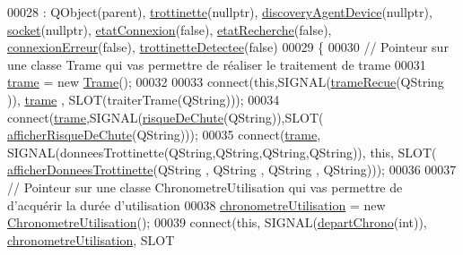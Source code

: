 \begin{DoxyCode}
00028                                                     : QObject(parent), 
      \hyperlink{class_peripherique_local_aa110b2c3292270553f592362e45f710b}{trottinette}(\textcolor{keyword}{nullptr}), \hyperlink{class_peripherique_local_a9e398b7dd89a20b1bee67b8c3467da69}{discoveryAgentDevice}(\textcolor{keyword}{nullptr}), 
      \hyperlink{class_peripherique_local_a0058bf8367b4b8f907838b83a9150c07}{socket}(\textcolor{keyword}{nullptr}), \hyperlink{class_peripherique_local_a5359e5a94b32b8a90c06ec999de13d2c}{etatConnexion}(\textcolor{keyword}{false}), \hyperlink{class_peripherique_local_a6638c29f6f75c3b4d329d93ae6ea4a48}{etatRecherche}(\textcolor{keyword}{false}), 
      \hyperlink{class_peripherique_local_ad0e396b67eed256a7f27277ca7bfafdd}{connexionErreur}(\textcolor{keyword}{false}), \hyperlink{class_peripherique_local_af6f664b6af67f1c90eb017391ac812ed}{trottinetteDetectee}(\textcolor{keyword}{false})
00029 \{
00030     \textcolor{comment}{// Pointeur sur une classe Trame qui vas permettre de réaliser le traitement de trame}
00031     \hyperlink{class_peripherique_local_a3c96dbda4eacf235c2bb0cabaa742122}{trame} = \textcolor{keyword}{new} \hyperlink{class_trame}{Trame}();
00032 
00033     connect(\textcolor{keyword}{this},SIGNAL(\hyperlink{class_peripherique_local_af980614027f938565b318eb1dfd579c5}{trameRecue}(QString )), \hyperlink{class_peripherique_local_a3c96dbda4eacf235c2bb0cabaa742122}{trame} , SLOT(traiterTrame(QString)));
00034     connect(\hyperlink{class_peripherique_local_a3c96dbda4eacf235c2bb0cabaa742122}{trame},SIGNAL(\hyperlink{class_peripherique_local_a79a43778c2db1c9c70784b6329dc383e}{risqueDeChute}(QString)),SLOT(
      \hyperlink{class_peripherique_local_ac20ba20d69997e441b1b782f8b506291}{afficherRisqueDeChute}(QString)));
00035     connect(\hyperlink{class_peripherique_local_a3c96dbda4eacf235c2bb0cabaa742122}{trame}, SIGNAL(donneesTrottinette(QString,QString,QString,QString)), \textcolor{keyword}{this}, SLOT(
      \hyperlink{class_peripherique_local_a5702930929fea3e197fc1938a2303961}{afficherDonneesTrottinette}(QString , QString , QString , QString)));
00036 
00037     \textcolor{comment}{// Pointeur sur une classe ChronometreUtilisation qui vas permettre de d'acquérir la durée
       d'utilisation}
00038     \hyperlink{class_peripherique_local_a89e0515901920b03e83066cf306f7f14}{chronometreUtilisation} = \textcolor{keyword}{new} \hyperlink{class_chronometre_utilisation}{ChronometreUtilisation}();
00039     connect(\textcolor{keyword}{this}, SIGNAL(\hyperlink{class_peripherique_local_a8c29d255e41df4bc381f4ff2d1451416}{departChrono}(\textcolor{keywordtype}{int})), \hyperlink{class_peripherique_local_a89e0515901920b03e83066cf306f7f14}{chronometreUtilisation}, SLOT

\end{DoxyCode}
